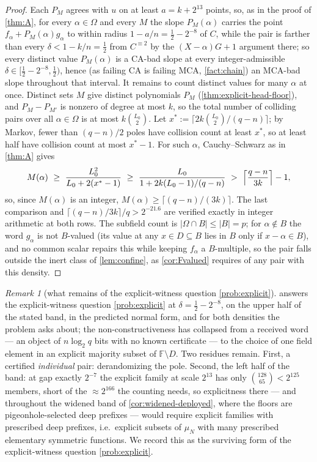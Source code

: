 \documentclass[11pt]{article}
\theoremstyle{definition}
\theoremstyle{remark}
\newtheorem{remark}[remark]{Remark}
\newcommand{\F}{\mathbb{F}}
\newcommand{\B}{B}
\begin{document}
\begin{proof}
Each $P_M$ agrees with $u$ on at least $a=k+2^{13}$ points, so, as in the proof of \cref{thm:A}, for every $\alpha\in\Omega$ and every $M$ the slope $P_M(\alpha)$ carries the point $f_\alpha+P_M(\alpha)g_\alpha$ to within radius $1-a/n=\frac12-2^{-8}$ of $C$, while the pair is farther than every $\delta<1-k/n=\frac12$ from $C^{\equiv2}$ by the $(X-\alpha)G+1$ argument there; so every distinct value $P_M(\alpha)$ is a CA-bad slope at every integer-admissible $\delta\in[\frac12-2^{-8},\frac12)$, hence \textup(as failing CA is failing MCA, \cref{fact:chain}\textup) an MCA-bad slope throughout that interval. It remains to count distinct values for many $\alpha$ at once. Distinct sets $M$ give distinct polynomials $P_M$ \textup(\cref{thm:explicit-head-floor}\textup), and $P_M-P_{M'}$ is nonzero of degree at most $k$, so the total number of colliding pairs over all $\alpha\in\Omega$ is at most $k\binom{L_0}2$. Let $x^*:=\lceil2k\binom{L_0}2/(q-n)\rceil$; by Markov, fewer than $(q-n)/2$ poles have collision count at least $x^*$, so at least half have collision count at most $x^*-1$. For such $\alpha$, Cauchy--Schwarz as in \cref{thm:A} gives
\[
M(\alpha)\ \ge\ \frac{L_0^2}{L_0+2(x^*-1)}\ \ge\ \frac{L_0}{1+2k(L_0-1)/(q-n)}\ >\ \Bigl\lceil\frac{q-n}{3k}\Bigr\rceil-1,
\]
so, since $M(\alpha)$ is an integer,
$M(\alpha)\ge\lceil(q-n)/(3k)\rceil$. The last comparison and
$\lceil(q-n)/3k\rceil/q>2^{-21.6}$ are verified exactly in integer arithmetic
at both rows. The subfield count is $|\Omega\cap\B|\le|\B|=p$; for
$\alpha\notin\B$ the word $g_\alpha$ is not $\B$-valued \textup(its value at any
$x\in D\subseteq\B$ lies in $\B$ only if $x-\alpha\in\B$\textup), and no common
scalar repairs this while keeping $f_\alpha$ a $\B$-multiple, so the pair falls
outside the inert class of \cref{lem:confine}, as \cref{cor:Fvalued} requires
of any pair with this density.
\end{proof}

\begin{remark}[what remains of the explicit-witness question \cref{prob:explicit}]\label{rem:explicit-scope}
 answers the explicit-witness question \cref{prob:explicit} at $\delta=\frac12-2^{-8}$, on the upper half of the stated band, in the predicted normal form, and for both densities the problem asks about; the non-constructiveness has collapsed from a received word --- an object of $n\log_2q$ bits with no known certificate --- to the choice of one field element in an explicit majority subset of $\F\setminus D$. Two residues remain. First, a certified \emph{individual} pair: derandomizing the pole. Second, the left half of the band: at gap exactly $2^{-7}$ the explicit family at scale $2^{13}$ has only $\binom{128}{65}<2^{125}$ members, short of the $\approx2^{166}$ the counting needs, so explicitness there --- and throughout the widened band of \cref{cor:widened-deployed}, where the floors are pigeonhole-selected deep prefixes --- would require explicit families with prescribed deep prefixes, i.e.\ explicit subsets of $\mu_N$ with many prescribed elementary symmetric functions. We record this as the surviving form of the explicit-witness question \cref{prob:explicit}.
\end{remark}
\end{document}
